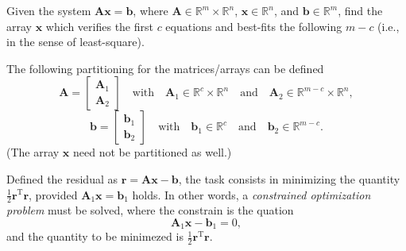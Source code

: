 \documentclass[b5paper,oneside]{article}
\begin{document}
Given the system $\bm A \bm x = \bm b$, where $\bm A \in \mathbb{R}^m \times
\mathbb{R}^n$, $\bm x \in \mathbb{R}^n$, and $\bm b \in \mathbb{R}^m$, find the
array $\bm x$ which verifies the first $c$ equations and best-fits the following
$m - c$ (i.e., in the sense of least-square).

The following partitioning for the matrices/arrays can be defined
\begin{equation*}
  \bm A = \begin{bmatrix}
    \bm A_1\\
    \bm A_2
  \end{bmatrix}\quad \text{with} \quad \bm A_1 \in \mathbb{R}^c \times \mathbb{R}^n \quad \text{and} \quad \bm A_2 \in \mathbb{R}^{m-c} \times \mathbb{R}^n,
\end{equation*}
\begin{equation*}
  \bm b = \begin{bmatrix}
    \bm b_1\\
    \bm b_2
  \end{bmatrix}\quad \text{with} \quad \bm b_1 \in \mathbb{R}^c \quad \text{and} \quad \bm b_2 \in \mathbb{R}^{m-c}.
\end{equation*}
(The array $\bm x$ need not be partitioned as well.)

Defined the residual as $\bm r = \bm A \bm x - \bm b$, the task consists in
minimizing the quantity $\frac{1}{2}\bm r^\text{T} \bm r$, provided $\bm A_1
\bm x = \bm b_1$ holds. In other words, a \emph{constrained optimization
problem} must be solved, where the constrain is the quation
\begin{equation}
  \bm A_1 \bm x - \bm b_1 = 0,\label{eq:constr}
\end{equation}
and the quantity to be minimezed is $\frac{1}{2}\bm r^\text{T} \bm r$.
\end{document}
